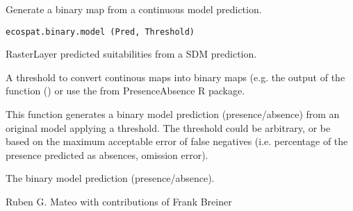 \documentclass[a4paper]{book}
\begin{document}
%
\begin{Description}\relax
Generate a binary map from a continuous model prediction.
\end{Description}
%
\begin{Usage}
\begin{verbatim}
ecospat.binary.model (Pred, Threshold)
\end{verbatim}
\end{Usage}
%
\begin{Arguments}
\begin{ldescription}
\item[\code{Pred}] RasterLayer predicted suitabilities from a SDM prediction.
\item[\code{Threshold}] A threshold to convert continous maps into binary maps (e.g. the output of the function () or use the  from PresenceAbsence R package.
\end{ldescription}
\end{Arguments}
%
\begin{Details}\relax
This function generates a binary model prediction (presence/absence) from an original model applying a threshold. The threshold could be arbitrary, or be based on the maximum acceptable error of false negatives (i.e. percentage of the presence predicted as absences, omission error).
\end{Details}
%
\begin{Value}
The binary model prediction (presence/absence).
\end{Value}
%
\begin{Author}\relax
Ruben G. Mateo  with contributions of Frank Breiner 
\end{Author}
%
\end{document}
